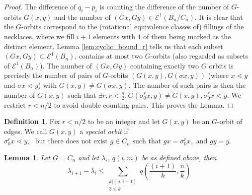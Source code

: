 \documentclass[10 pt]{amsart}
\theoremstyle{plain}
\newtheorem{lem}[thm]{Lemma}
\theoremstyle{definition}
\newtheorem{defn}[thm]{Definition}
\theoremstyle{remark}
\numberwithin{equation}{section}
\begin{document}
\begin{proof}

 The difference of $q_i - p_i$ is counting the difference of the number of $G$-orbits $G (x ,y)$ and the number of $(Gx,Gy) \in \mathcal E^1(B_n/C_n)$. It is clear that the $G$-orbits correspond to the (rotational equivalence classes of) fillings of the necklaces, where we fill $i+1$ elements with $1$ of them being marked as the distinct element. Lemma \ref{lem:cyclic_bound_r} tells us that each subset $(Gx, Gy) \subset \mathcal E^1 (B_n)$, contains at most two $G$-orbits (also regarded as subsets of $\mathcal E^1 (B_n)$). The number of $(Gx, Gy)$ containing exactly two $G$ orbits is precisely the number of pairs of $G$-orbits $(G (x, y),G(\sigma x, y ))$ (where $ x \lessdot y$ and $\sigma x \lessdot y$) with $G(x, y) \neq G(\sigma x, y).$ The number of such pairs is then the number of $G(x, y)$ such that $ \exists r,r<\frac n 2, G(\sigma_0^r x, y)\neq G(x, y),\sigma_0^r x \lessdot y.$ We restrict $r < n/2$ to avoid double counting pairs. This proves the Lemma.
\end{proof}


\begin{defn}
Fix $r < n/2$ to be an integer and let $ G(x, y)$ be an $G$-orbit of edges. We call $G(x , y)$ a {\it special orbit} if  $ \sigma_0^r x \lessdot y, \, \, \text{ but  there does not exist } g \in C_n \text{ such that } g x = \sigma_0 ^r x,  \text{ and }g y = y$. 
\end{defn}


\begin{lem}{\label{lem:cyclic_bounding_lambda}} 
Let $G =C_n$ and let $\lambda_i$, $q(i,m)$ be as defined above,  then $$\lambda_{i+1} - \lambda_i \le \sum_{\substack{k | (n , i+1) \\ 3 \le k }} q \left(\frac{(i+1)}{k},\frac{n}{k}\right) $$ 
\end{lem}
\end{document}
